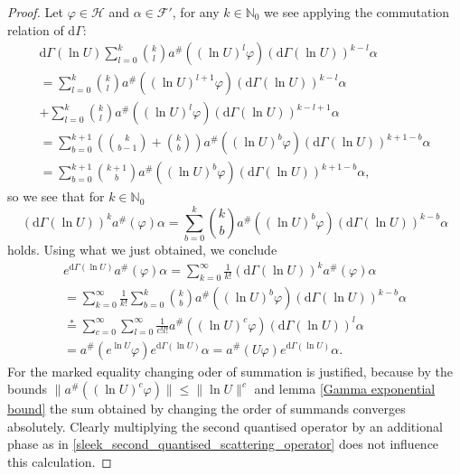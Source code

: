 \documentclass[b5paper,draft,openbib,12pt]{memoir}
\begin{document}
\begin{proof}
Let \(\varphi\in \mathcal{H}\) and \(\alpha\in \mathcal{F}'\), 
for any \(k\in \mathbb{N}_0\) we see applying the commutation 
relation of \(\mathrm{d}\Gamma\):
\begin{multline*}
\mathrm{d}\Gamma(\ln U) \sum_{l=0}^k \binom{k}{l} a^\# \left(\left(\ln U\right)^l \varphi \right) \left(\mathrm{d}\Gamma(\ln U)\right)^{k-l} \alpha\\
=\sum_{l=0}^k \binom{k}{l} a^\# \left(\left(\ln U\right)^{l+1} \varphi \right) \left(\mathrm{d}\Gamma(\ln U)\right)^{k-l}\alpha\\
+\sum_{l=0}^k \binom{k}{l} a^\# \left(\left(\ln U\right)^l \varphi \right) \left(\mathrm{d}\Gamma(\ln U)\right)^{k-l+1}\alpha\\
= \sum_{b=0}^{k+1} \left( \binom{k}{b-1} + \binom{k}{b}\right) a^\#\left( (\ln U)^b \varphi\right) \left( \mathrm{d}\Gamma(\ln U)\right)^{k+1-b}\alpha\\
=\sum_{b=0}^{k+1}  \binom{k+1}{b}  a^\#\left( (\ln U)^b \varphi\right) \left( \mathrm{d}\Gamma(\ln U)\right)^{k+1-b}\alpha,
\end{multline*}
so we see that for \(k\in\mathbb{N}_0\)
\begin{equation}
\left(\mathrm{d}\Gamma(\ln U)\right)^k a^\# (\varphi) \alpha= \sum_{b=0}^{k}  \binom{k}{b}  a^\#\left( (\ln U)^b \varphi\right) \left( \mathrm{d}\Gamma(\ln U)\right)^{k-b}\alpha
\end{equation}
holds. Using what we just obtained, we conclude
\begin{multline*}
e^{\mathrm{d}\Gamma(\ln U)}a^\#(\varphi) \alpha = \sum_{k=0}^\infty \frac{1}{k!} \left(\mathrm{d}\Gamma(\ln U)\right)^k a^\# (\varphi)\alpha\\
=\sum_{k=0}^\infty \frac{1}{k!}  \sum_{b=0}^{k}  \binom{k}{b}  a^\#\left( (\ln U)^b \varphi \right) \left( \mathrm{d}\Gamma(\ln U)\right)^{k-b}\alpha\\
\overset{*}{=}\sum_{c=0}^\infty \sum_{l=0}^\infty \frac{1}{c! l!} a^\#\left( (\ln U)^c \varphi \right) \left( \mathrm{d}\Gamma(\ln U)\right)^{l}\alpha\\
=a^\#\left( e^{\ln U} \varphi \right) e^{\mathrm{d}\Gamma( \ln U)}\alpha
=a^\#\left( U \varphi \right) e^{\mathrm{d}\Gamma( \ln U)}\alpha.
\end{multline*}
For the marked equality changing oder of summation is justified, because by the bounds
 \(\|a^\#((\ln U)^c \varphi)\|\le \|\ln U\|^c\) and  lemma \ref{Gamma exponential bound} the sum obtained by changing the order
 of summands converges absolutely.
Clearly multiplying the second quantised operator by an additional phase as in 
\eqref{sleek_second_quantised_scattering_operator} does not influence this calculation.
\end{proof}
\end{document}
